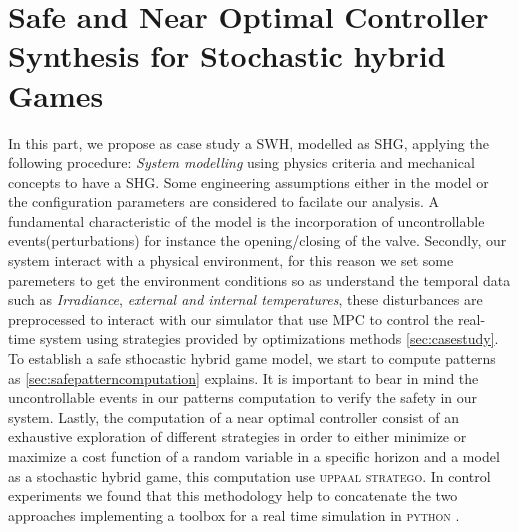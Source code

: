 \chapter{Safe and Near Optimal Controller Synthesis for Stochastic hybrid Games}
  \label{ch:proposal} %
  In this part, we propose as case study a \ac{SWH}, modelled as 
  \ac{SHG}, applying the following procedure:
  \emph{System modelling} using physics criteria \cite{tsilingiris1996solar} and
  mechanical concepts to have a \ac{SHG}. Some engineering 
  assumptions either in the model or
  the configuration parameters are considered to facilate our analysis.
  A fundamental characteristic  of the model is the incorporation 
  of uncontrollable events(perturbations) for instance the opening/closing of the valve.
  Secondly, our system interact with a physical environment, for this reason 
  we set some paremeters to get the environment conditions so as 
  understand the temporal data such as \emph{Irradiance}, \emph{external and 
  internal temperatures}, these disturbances are preprocessed to interact
  with our simulator that use \ac{MPC} to control the real-time system 
  using strategies provided by optimizations methods \autoref{sec:casestudy}. 
  To establish a safe sthocastic hybrid game model, we start to compute patterns as
  \autoref{sec:safepatterncomputation} explains. It is important to bear in mind
  the uncontrollable events in our patterns computation to verify the safety
  in our system.
  Lastly, the computation of a near optimal controller consist of an 
  exhaustive exploration of different strategies in order to either
  minimize or maximize a cost function of a random variable in a 
  specific horizon and a model as a stochastic hybrid game, this 
  computation use \textsc{uppaal stratego}. In control experiments 
  we found that this methodology help to concatenate the two 
  approaches implementing a toolbox for a real time simulation in 
  \textsc{python} \cite{larsen2016online}.
  \clearpage
